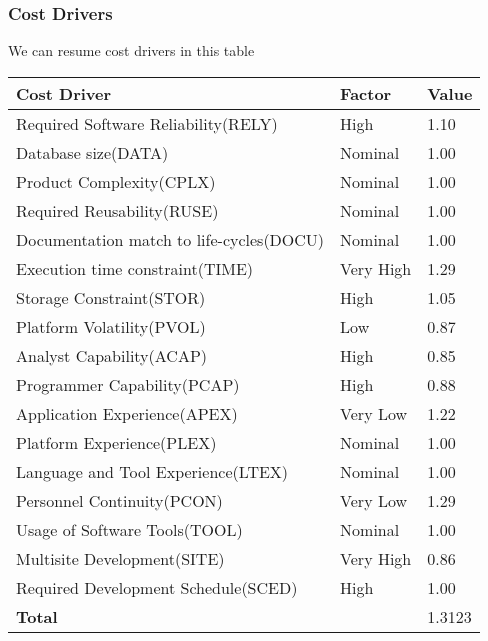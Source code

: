 \subsubsection{Cost Drivers}



















We can resume cost drivers in this table\\
\begin{tabular}{|p{8cm}|p{3cm}|p{2cm}|}
\hline
\textbf{Cost Driver} & \textbf{Factor} & \textbf{Value}\\
\hline
Required Software Reliability(RELY) & High & 1.10\\
Database size(DATA) & Nominal & 1.00\\
Product Complexity(CPLX) & Nominal & 1.00\\
Required Reusability(RUSE) & Nominal & 1.00\\
Documentation match to life-cycles(DOCU) & Nominal & 1.00\\
Execution time constraint(TIME) & Very High & 1.29\\
Storage Constraint(STOR) & High & 1.05\\
Platform Volatility(PVOL) & Low & 0.87\\
Analyst Capability(ACAP) & High & 0.85\\
Programmer Capability(PCAP) & High & 0.88\\
Application Experience(APEX) & Very Low & 1.22\\
Platform Experience(PLEX) & Nominal & 1.00\\
Language and Tool Experience(LTEX) & Nominal & 1.00\\
Personnel Continuity(PCON) & Very Low & 1.29\\
Usage of Software Tools(TOOL) & Nominal & 1.00\\
Multisite Development(SITE) & Very High & 0.86\\
Required Development Schedule(SCED) & High & 1.00\\
\hline
\multicolumn{2}{|l|}{\textbf{Total}} & 1.3123\\
\hline
\end{tabular}
